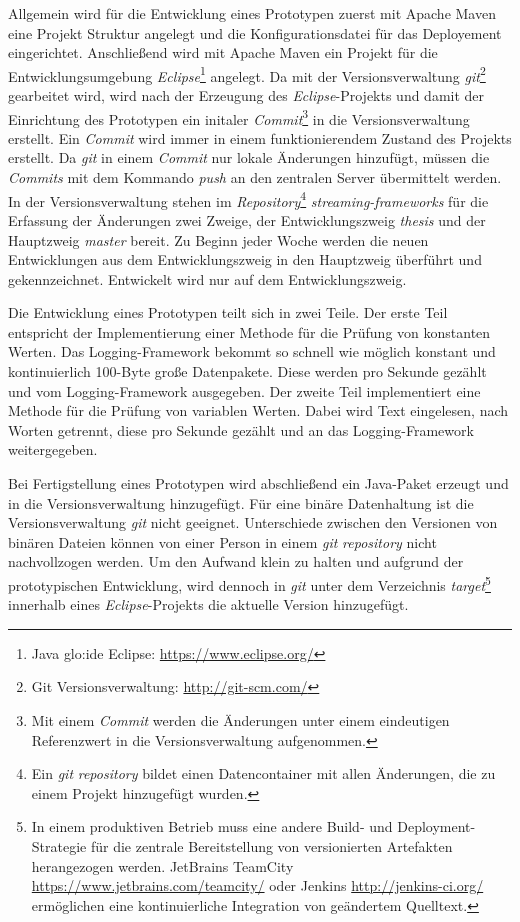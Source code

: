 Allgemein wird für die Entwicklung eines Prototypen zuerst mit Apache Maven eine Projekt Struktur angelegt und die Konfigurationsdatei für das Deployement eingerichtet. Anschließend wird mit Apache Maven ein Projekt für die Entwicklungsumgebung \textit{Eclipse}\footnote{Java \gls{glo:ide} Eclipse: \url{https://www.eclipse.org/}} angelegt. Da mit der Versionsverwaltung \textit{git}\footnote{Git Versionsverwaltung: \url{http://git-scm.com/}} gearbeitet wird, wird nach der Erzeugung des \textit{Eclipse}-Projekts und damit der Einrichtung des Prototypen ein initaler \textit{Commit}\footnote{Mit einem \textit{Commit} werden die Änderungen unter einem eindeutigen Referenzwert in die Versionsverwaltung aufgenommen.} in die Versionsverwaltung erstellt. Ein \textit{Commit} wird immer in einem funktionierendem Zustand des Projekts erstellt. Da \textit{git} in einem \textit{Commit} nur lokale Änderungen hinzufügt, müssen die \textit{Commits} mit dem Kommando \textit{push} an den zentralen Server übermittelt werden. In der Versionsverwaltung stehen im \textit{Repository}\footnote{Ein \textit{git} \textit{repository} bildet einen Datencontainer mit allen Änderungen, die zu einem Projekt hinzugefügt wurden.} \textit{streaming-frameworks} für die Erfassung der Änderungen zwei Zweige, der Entwicklungszweig \textit{thesis} und der Hauptzweig \textit{master} bereit. Zu Beginn jeder Woche werden die neuen Entwicklungen aus dem Entwicklungszweig in den Hauptzweig überführt und gekennzeichnet. Entwickelt wird nur auf dem Entwicklungszweig.

Die Entwicklung eines Prototypen teilt sich in zwei Teile. Der erste Teil entspricht der Implementierung einer Methode für die Prüfung von konstanten Werten. Das Logging-Framework bekommt so schnell wie möglich konstant und kontinuierlich 100-Byte große Datenpakete. Diese werden pro Sekunde gezählt und vom Logging-Framework ausgegeben. Der zweite Teil implementiert eine Methode für die Prüfung von variablen Werten. Dabei wird Text eingelesen, nach Worten getrennt, diese pro Sekunde gezählt und an das Logging-Framework weitergegeben.

Bei Fertigstellung eines Prototypen wird abschließend ein Java-Paket erzeugt und in die Versionsverwaltung hinzugefügt. Für eine binäre Datenhaltung ist die Versionsverwaltung \textit{git} nicht geeignet. Unterschiede zwischen den Versionen von binären Dateien können von einer Person in einem \textit{git} \textit{repository} nicht nachvollzogen werden. Um den Aufwand klein zu halten und aufgrund der prototypischen Entwicklung, wird dennoch in \textit{git} unter dem Verzeichnis \textit{target}\footnote{In einem produktiven Betrieb muss eine andere Build- und Deployment-Strategie für die zentrale Bereitstellung von versionierten Artefakten herangezogen werden. JetBrains TeamCity \url{https://www.jetbrains.com/teamcity/} oder Jenkins \url{http://jenkins-ci.org/} ermöglichen eine kontinuierliche Integration von geändertem Quelltext.} innerhalb eines \textit{Eclipse}-Projekts die aktuelle Version hinzugefügt. 

